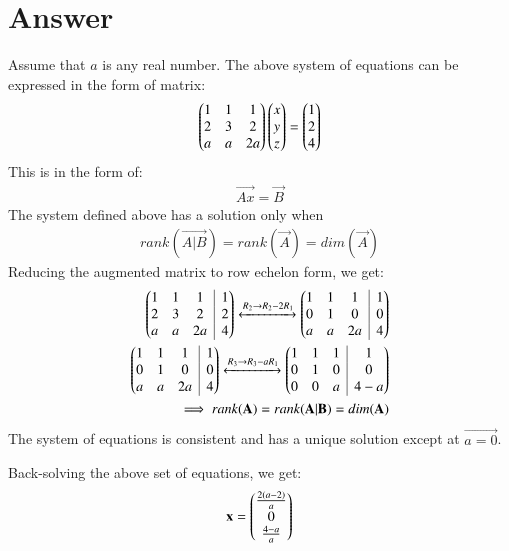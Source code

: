 \documentclass[journal,12pt,twocolumn]{IEEEtran}
\begin{document}
\section{Answer}
Assume that $a$ is any real number. The above system of equations can be expressed in the form of matrix:
\begin{align}
\begin{pmatrix}1 & 1 & 1\\2 & 3 & 2\\a & a & 2a\end{pmatrix} \begin{pmatrix}x\\y\\z\end{pmatrix} = \begin{pmatrix}1\\2\\4\end{pmatrix}
\end{align}
This is in the form of:
\begin{align}
\label{eqn_aug}
\vec{Ax}=\vec{B}
\end{align}
The system defined above has a solution only when
\begin{align*}
rank(\vec{A|B}) = rank(\vec{A}) = dim(\vec{A})
\end{align*}
Reducing the augmented matrix to row echelon form, we get:
\begin{align}
\myvec{1 & 1 & 1 & \BAR & 1 \\2 & 3 & 2 & \BAR & 2 \\a & a & 2a & \BAR & 4}
\xleftrightarrow[]{R_2\rightarrow R_2-2R_1}
\myvec{1 & 1 & 1 & \BAR & 1 \\0 & 1 & 0 & \BAR & 0 \\a & a & 2a & \BAR & 4}
\\ \myvec{1 & 1 & 1 & \BAR & 1 \\0 & 1 & 0 & \BAR & 0 \\a & a & 2a & \BAR & 4}\xleftrightarrow[]{R_3\rightarrow R_3-aR_1}
\myvec{1 & 1 & 1 & \BAR & 1 \\0 & 1 & 0 & \BAR & 0 \\0 & 0 & a & \BAR & 4-a}
\\ \implies rank(\vec{A}) = rank(\vec{A|B}) = dim(\vec{A})
\end{align}
The system of equations is consistent and has a unique solution except at $\vec{a = 0}$.

Back-solving the above set of equations, we get:
\begin{align}
\mathbf{x} = \begin{pmatrix}\frac{2(a - 2)}{a} \\ 0 \\ \frac{4-a}{a}\end{pmatrix}
\end{align}
\end{document}
